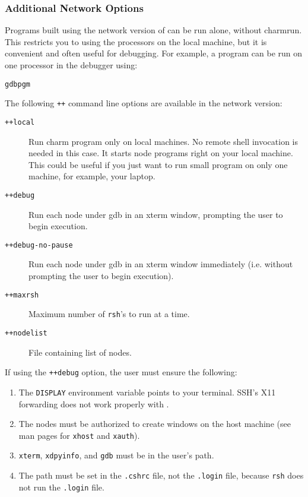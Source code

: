 \subsubsection{Additional Network Options}
\label{network command line options}

Programs built using the network version of \charmpp{} can be
run alone, without charmrun.  This restricts you to using the 
processors on the local
machine, but it is convenient and often useful for debugging.
For example, a \charmpp{} program can be run on one processor
in the debugger using:

\begin{alltt}
gdb pgm
\end{alltt}


The following {\tt ++} command line options are available in
the network version:
\begin{description}

\item[{\tt ++local}] Run charm program only on local machines. No 
 remote shell invocation is needed in this case. It starts node programs 
 right on your local machine. This could be useful if you just want to 
 run small program on only one machine, for example, your laptop.

\item[{\tt ++debug}] Run each node under gdb in an xterm window, prompting
the user to begin execution.

\item[{\tt ++debug-no-pause}] Run each node under gdb in an xterm window
immediately (i.e. without prompting the user to begin execution).

\item[{\tt ++maxrsh}] Maximum number of {\tt rsh}'s to run at a
time.

\item[{\tt ++nodelist}] File containing list of nodes.

\end{description}

If using the {\tt ++debug} option, the user must ensure the
following:
\begin{enumerate}

\item The {\tt DISPLAY} environment variable points to your terminal.
SSH's X11 forwarding does not work properly with \charmpp{}.

\item The nodes must be authorized to create windows on the host machine (see
man pages for {\tt xhost} and {\tt xauth}).

\item {\tt xterm}, {\tt xdpyinfo},  and {\tt gdb} must be in
the user's path.

\item The path must be set in the {\tt .cshrc} file, not the {\tt .login}
file, because {\tt rsh} does not run the {\tt .login} file. 

\end{enumerate}



